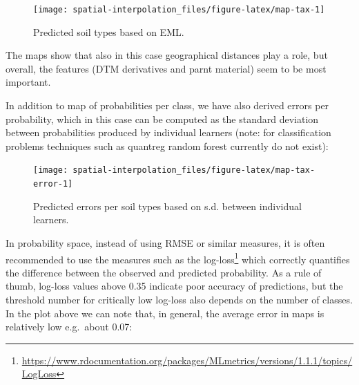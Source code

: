 \documentclass[
  graybox,natbib,nospthms]{svmono}
\newenvironment{Shaded}{\begin{snugshade}}{\end{snugshade}}
\newcommand{\AttributeTok}[1]{\textcolor[rgb]{0.61,0.61,0.61}{#1}}
\newcommand{\DecValTok}[1]{\textcolor[rgb]{0.06,0.06,0.06}{#1}}
\newcommand{\FloatTok}[1]{\textcolor[rgb]{0.06,0.06,0.06}{#1}}
\newcommand{\FunctionTok}[1]{\textcolor[rgb]{0,0,0}{#1}}
\newcommand{\NormalTok}[1]{#1}
\newcommand{\SpecialCharTok}[1]{\textcolor[rgb]{0,0,0}{#1}}
\newcommand{\StringTok}[1]{\textcolor[rgb]{0.5,0.5,0.5}{#1}}
\renewcommand{\href}[2]{#2 (\url{#1})}
\renewcommand{\href}[2]{#2\footnote{\url{#1}}}
\begin{document}
\begin{figure}

{\centering \texttt{[image: spatial-interpolation\_files/figure-latex/map-tax-1]} 

}

\caption{Predicted soil types based on EML.}\label{fig:map-tax}
\end{figure}

The maps show that also in this case geographical distances play a role, but
overall, the features (DTM derivatives and parnt material) seem to be most important.

In addition to map of probabilities per class, we have also derived errors per
probability, which in this case can be computed as the standard deviation between
probabilities produced by individual learners (note: for classification problems
techniques such as quantreg random forest currently do not exist):

\begin{Shaded}
\end{Shaded}

\begin{figure}

{\centering \texttt{[image: spatial-interpolation\_files/figure-latex/map-tax-error-1]} 

}

\caption{Predicted errors per soil types based on s.d. between individual learners.}\label{fig:map-tax-error}
\end{figure}

In probability space, instead of using RMSE or similar measures, it is often
recommended to use the measures such as the \href{https://www.rdocumentation.org/packages/MLmetrics/versions/1.1.1/topics/LogLoss}{log-loss} which
correctly quantifies the difference between the observed and predicted probability.
As a rule of thumb, log-loss values above 0.35 indicate poor accuracy of predictions,
but the threshold number for critically low log-loss also depends on the number
of classes. In the plot above we can note that, in general, the average error in
maps is relatively low e.g.~about 0.07:
\end{document}
